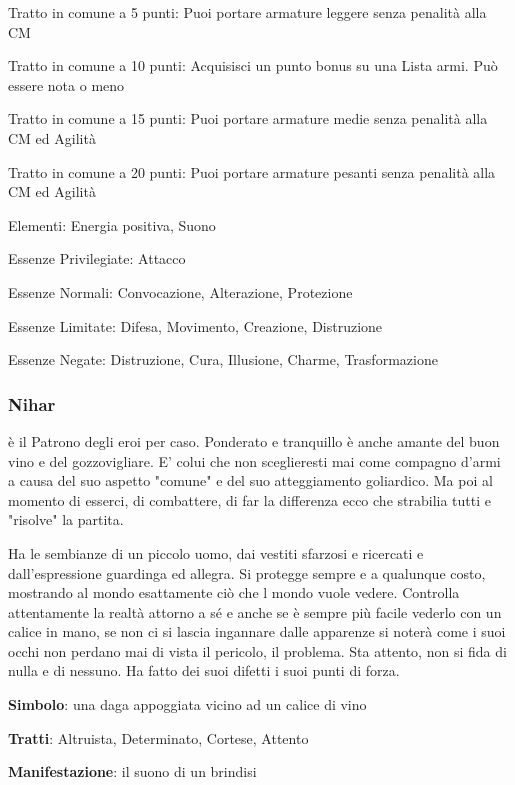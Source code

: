 \documentclass[a4paper,11pt,twoside,openany]{book}
\begin{document}
\bigskip

Tratto in comune a 5 punti: Puoi portare armature leggere senza penalità alla CM

Tratto in comune a 10 punti: Acquisisci un punto bonus su una Lista armi. Può essere nota o meno

Tratto in comune a 15 punti: Puoi portare armature medie senza penalità alla CM ed Agilità

Tratto in comune a 20 punti: Puoi portare armature pesanti senza penalità alla CM ed Agilità

\bigskip

Elementi: Energia positiva, Suono

\bigskip

Essenze Privilegiate: Attacco

Essenze Normali: Convocazione, Alterazione, Protezione

Essenze Limitate: Difesa, Movimento, Creazione, Distruzione

Essenze Negate: Distruzione, Cura, Illusione, Charme, Trasformazione

\subsubsection{Nihar}

\label{nihar}

è il Patrono degli eroi per caso. Ponderato e tranquillo è anche amante del buon vino e del gozzovigliare. E' colui che non sceglieresti mai come compagno d'armi a causa del suo aspetto "comune" e del suo atteggiamento goliardico. Ma poi al momento di esserci, di combattere, di far la differenza ecco che strabilia tutti e "risolve" la partita.

Ha le sembianze di un piccolo uomo, dai vestiti sfarzosi e ricercati e dall'espressione guardinga ed allegra. Si protegge sempre e a qualunque costo, mostrando al mondo esattamente ciò che l mondo vuole vedere. Controlla attentamente la realtà attorno a sé e anche se è sempre più facile vederlo con un calice in mano, se non ci si lascia ingannare dalle apparenze si noterà come i suoi occhi non perdano mai di vista il pericolo, il problema. Sta attento, non si fida di nulla e di nessuno. Ha fatto dei suoi difetti i suoi punti di forza.

\textbf{Simbolo}: una daga appoggiata vicino ad un calice di vino

\textbf{Tratti}: Altruista, Determinato, Cortese, Attento

\textbf{Manifestazione}: il suono di un brindisi
\end{document}
